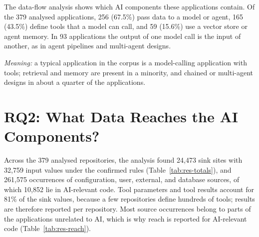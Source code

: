 The data-flow analysis shows which AI components these applications contain. Of the 379 analysed applications, 256 (67.5\%) pass data to a model or agent, 165 (43.5\%) define tools that a model can call, and 59 (15.6\%) use a vector store or agent memory. In 93 applications the output of one model call is the input of another, as in agent pipelines and multi-agent designs.

\emph{Meaning:} a typical application in the corpus is a model-calling application with tools; retrieval and memory are present in a minority, and chained or multi-agent designs in about a quarter of the applications.

\section{RQ2: What Data Reaches the AI Components?}
\label{sec:res-rq2}

Across the 379 analysed repositories, the analysis found 24{,}473 sink sites with 32{,}759 input values under the confirmed rules (Table~\ref{tab:res-totals}), and 261{,}575 occurrences of configuration, user, external, and database sources, of which 10{,}852 lie in AI-relevant code. Tool parameters and tool results account for 81\% of the sink values, because a few repositories define hundreds of tools; results are therefore reported per repository. Most source occurrences belong to parts of the applications unrelated to AI, which is why reach is reported for AI-relevant code (Table~\ref{tab:res-reach}).

